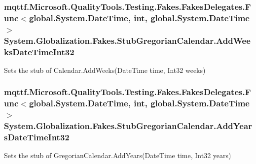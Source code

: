 \hypertarget{class_system_1_1_globalization_1_1_fakes_1_1_stub_gregorian_calendar_ac5734a8a2073e2d9e9a0571bebe6fe39}{
\subsubsection[{Add\-Weeks\-Date\-Time\-Int32}]{\setlength{\rightskip}{0pt plus 5cm}mqttf.\-Microsoft.\-Quality\-Tools.\-Testing.\-Fakes.\-Fakes\-Delegates.\-Func$<$global.\-System.\-Date\-Time, int, global.\-System.\-Date\-Time$>$ System.\-Globalization.\-Fakes.\-Stub\-Gregorian\-Calendar.\-Add\-Weeks\-Date\-Time\-Int32}}\label{class_system_1_1_globalization_1_1_fakes_1_1_stub_gregorian_calendar_ac5734a8a2073e2d9e9a0571bebe6fe39}


Sets the stub of Calendar.\-Add\-Weeks(\-Date\-Time time, Int32 weeks)

\hypertarget{class_system_1_1_globalization_1_1_fakes_1_1_stub_gregorian_calendar_a65de622dccc17f2f04803da2ebcbff7f}{
\subsubsection[{Add\-Years\-Date\-Time\-Int32}]{\setlength{\rightskip}{0pt plus 5cm}mqttf.\-Microsoft.\-Quality\-Tools.\-Testing.\-Fakes.\-Fakes\-Delegates.\-Func$<$global.\-System.\-Date\-Time, int, global.\-System.\-Date\-Time$>$ System.\-Globalization.\-Fakes.\-Stub\-Gregorian\-Calendar.\-Add\-Years\-Date\-Time\-Int32}}\label{class_system_1_1_globalization_1_1_fakes_1_1_stub_gregorian_calendar_a65de622dccc17f2f04803da2ebcbff7f}


Sets the stub of Gregorian\-Calendar.\-Add\-Years(\-Date\-Time time, Int32 years)

